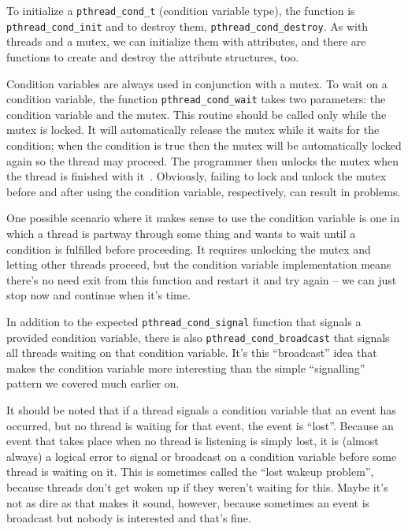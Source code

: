 To initialize a \texttt{pthread\_cond\_t} (condition variable type), the function is \texttt{pthread\_cond\_init} and to destroy them, \texttt{pthread\_cond\_destroy}. As with threads and a mutex, we can initialize them with attributes, and there are functions to create and destroy the attribute structures, too. 

Condition variables are always used in conjunction with a mutex. To wait on a condition variable, the function \texttt{pthread\_cond\_wait} takes two parameters: the condition variable and the mutex. This routine should be called only while the mutex is locked. It will automatically release the mutex while it waits for the condition; when the condition is true then the mutex will be automatically locked again so the thread may proceed. The programmer then unlocks the mutex when the thread is finished with it~\cite{pthreads}. Obviously, failing to lock and unlock the mutex before and after using the condition variable, respectively, can result in problems.

One possible scenario where it makes sense to use the condition variable is one in which a thread is partway through some thing and wants to wait until a condition is fulfilled before proceeding. It requires unlocking the mutex and letting other threads proceed, but the condition variable implementation means there's no need exit from this function and restart it and try again -- we can just stop now and continue when it's time.

In addition to the expected \texttt{pthread\_cond\_signal} function that signals a provided condition variable, there is also \texttt{pthread\_cond\_broadcast} that signals all threads waiting on that condition variable. It's this ``broadcast'' idea that makes the condition variable more interesting than the simple ``signalling'' pattern we covered much earlier on.

It should be noted that if a thread signals a condition variable that an event has occurred, but no thread is waiting for that event, the event is ``lost''.  Because an event that takes place when no thread is listening is simply lost, it is (almost always) a logical error to signal or broadcast on a condition variable before some thread is waiting on it. This is sometimes called the ``lost wakeup problem'', because threads don't get woken up if they weren't waiting for this. Maybe it's not as dire as that makes it sound, however, because sometimes an event is broadcast but nobody is interested and that's fine.

